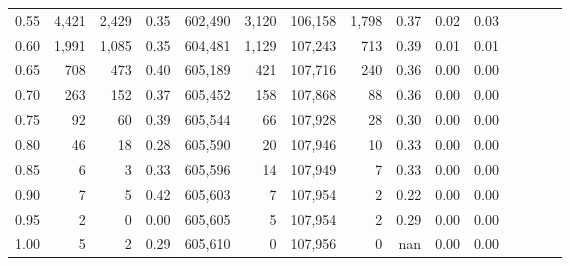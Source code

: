 \begin{tabular}{rrrcrrrrrrrrrrr}
0.55 &    4,421 &   2,429 &                                       0.35 &  602,490 &    3,120 &  106,158 &    1,798 &  0.37 &  0.02 &                         0.03 \\
0.60 &    1,991 &   1,085 &                                       0.35 &  604,481 &    1,129 &  107,243 &      713 &  0.39 &  0.01 &                         0.01 \\
0.65 &      708 &     473 &                                       0.40 &  605,189 &      421 &  107,716 &      240 &  0.36 &  0.00 &                         0.00 \\
0.70 &      263 &     152 &                                       0.37 &  605,452 &      158 &  107,868 &       88 &  0.36 &  0.00 &                         0.00 \\
0.75 &       92 &      60 &                                       0.39 &  605,544 &       66 &  107,928 &       28 &  0.30 &  0.00 &                         0.00 \\
0.80 &       46 &      18 &                                       0.28 &  605,590 &       20 &  107,946 &       10 &  0.33 &  0.00 &                         0.00 \\
0.85 &        6 &       3 &                                       0.33 &  605,596 &       14 &  107,949 &        7 &  0.33 &  0.00 &                         0.00 \\
0.90 &        7 &       5 &                                       0.42 &  605,603 &        7 &  107,954 &        2 &  0.22 &  0.00 &                         0.00 \\
0.95 &        2 &       0 &                                       0.00 &  605,605 &        5 &  107,954 &        2 &  0.29 &  0.00 &                         0.00 \\
1.00 &        5 &       2 &                                       0.29 &  605,610 &        0 &  107,956 &        0 &   nan &  0.00 &                         0.00 \\
\bottomrule
\end{tabular}

